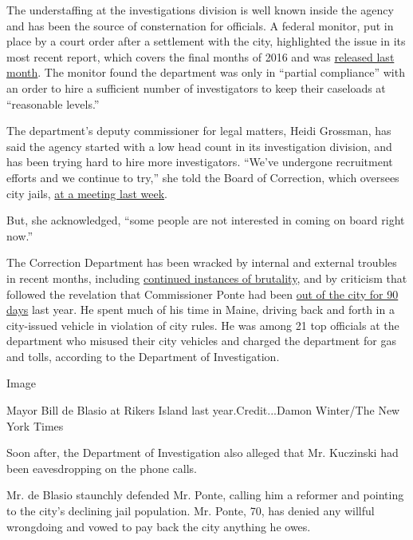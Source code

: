 The understaffing at the investigations division is well known inside
the agency and has been the source of consternation for officials. A
federal monitor, put in place by a court order after a settlement with
the city, highlighted the issue in its most recent report, which covers
the final months of 2016 and was
\href{https://www.exiger.com/sites/default/files/Third\%20Monitor\%27s\%20Report\%20-04-03-17\%20-\%20Filed\%20with\%20Appendix\%5B3\%5D.pdf}{released
last month}. The monitor found the department was only in ``partial
compliance'' with an order to hire a sufficient number of investigators
to keep their caseloads at ``reasonable levels.''

The department's deputy commissioner for legal matters, Heidi Grossman,
has said the agency started with a low head count in its investigation
division, and has been trying hard to hire more investigators. ``We've
undergone recruitment efforts and we continue to try,'' she told the
Board of Correction, which oversees city jails,
\href{https://www.youtube.com/watch?v=6943Sid0lTw\&feature=youtu.be}{at
a meeting last week}.

But, she acknowledged, ``some people are not interested in coming on
board right now.''

The Correction Department has been wracked by internal and external
troubles in recent months, including
\href{https://www.nytimes3xbfgragh.onion/2017/04/03/nyregion/brutal-force-at-rikers-island-continues-at-an-alarming-rate-report-says.html}{continued
instances of brutality}, and by criticism that followed the revelation
that Commissioner Ponte had been
\href{https://www.nytimes3xbfgragh.onion/2017/04/28/nyregion/new-york-correction-commissioner-joseph-ponte-reprimand.html}{out
of the city for 90 days} last year. He spent much of his time in Maine,
driving back and forth in a city-issued vehicle in violation of city
rules. He was among 21 top officials at the department who misused their
city vehicles and charged the department for gas and tolls, according to
the Department of Investigation.

Image

Mayor Bill de Blasio at Rikers Island last year.Credit...Damon
Winter/The New York Times

Soon after, the Department of Investigation also alleged that Mr.
Kuczinski had been eavesdropping on the phone calls.

Mr. de Blasio staunchly defended Mr. Ponte, calling him a reformer and
pointing to the city's declining jail population. Mr. Ponte, 70, has
denied any willful wrongdoing and vowed to pay back the city anything he
owes.

